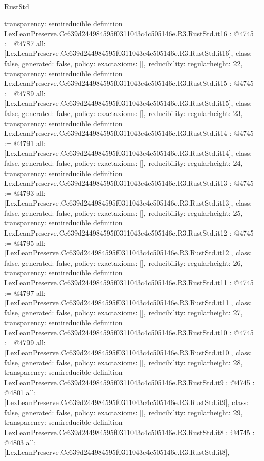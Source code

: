 \begin{lexlean}{RustStd}
\begin{coremodule}
{  transparency: semireducible
}
definition LexLeanPreserve.Cc639d244984595f0311043c4c505146e.R3.RustStd.it16 : @4745 := @4787 {
  all: [LexLeanPreserve.Cc639d244984595f0311043c4c505146e.R3.RustStd.it16],
  class: false,
  generated: false,
  policy: exact{axioms: []},
  reducibility: regular{height: 22},
  transparency: semireducible
}
definition LexLeanPreserve.Cc639d244984595f0311043c4c505146e.R3.RustStd.it15 : @4745 := @4789 {
  all: [LexLeanPreserve.Cc639d244984595f0311043c4c505146e.R3.RustStd.it15],
  class: false,
  generated: false,
  policy: exact{axioms: []},
  reducibility: regular{height: 23},
  transparency: semireducible
}
definition LexLeanPreserve.Cc639d244984595f0311043c4c505146e.R3.RustStd.it14 : @4745 := @4791 {
  all: [LexLeanPreserve.Cc639d244984595f0311043c4c505146e.R3.RustStd.it14],
  class: false,
  generated: false,
  policy: exact{axioms: []},
  reducibility: regular{height: 24},
  transparency: semireducible
}
definition LexLeanPreserve.Cc639d244984595f0311043c4c505146e.R3.RustStd.it13 : @4745 := @4793 {
  all: [LexLeanPreserve.Cc639d244984595f0311043c4c505146e.R3.RustStd.it13],
  class: false,
  generated: false,
  policy: exact{axioms: []},
  reducibility: regular{height: 25},
  transparency: semireducible
}
definition LexLeanPreserve.Cc639d244984595f0311043c4c505146e.R3.RustStd.it12 : @4745 := @4795 {
  all: [LexLeanPreserve.Cc639d244984595f0311043c4c505146e.R3.RustStd.it12],
  class: false,
  generated: false,
  policy: exact{axioms: []},
  reducibility: regular{height: 26},
  transparency: semireducible
}
definition LexLeanPreserve.Cc639d244984595f0311043c4c505146e.R3.RustStd.it11 : @4745 := @4797 {
  all: [LexLeanPreserve.Cc639d244984595f0311043c4c505146e.R3.RustStd.it11],
  class: false,
  generated: false,
  policy: exact{axioms: []},
  reducibility: regular{height: 27},
  transparency: semireducible
}
definition LexLeanPreserve.Cc639d244984595f0311043c4c505146e.R3.RustStd.it10 : @4745 := @4799 {
  all: [LexLeanPreserve.Cc639d244984595f0311043c4c505146e.R3.RustStd.it10],
  class: false,
  generated: false,
  policy: exact{axioms: []},
  reducibility: regular{height: 28},
  transparency: semireducible
}
definition LexLeanPreserve.Cc639d244984595f0311043c4c505146e.R3.RustStd.it9 : @4745 := @4801 {
  all: [LexLeanPreserve.Cc639d244984595f0311043c4c505146e.R3.RustStd.it9],
  class: false,
  generated: false,
  policy: exact{axioms: []},
  reducibility: regular{height: 29},
  transparency: semireducible
}
definition LexLeanPreserve.Cc639d244984595f0311043c4c505146e.R3.RustStd.it8 : @4745 := @4803 {
  all: [LexLeanPreserve.Cc639d244984595f0311043c4c505146e.R3.RustStd.it8],
}
\end{coremodule}
\end{lexlean}
